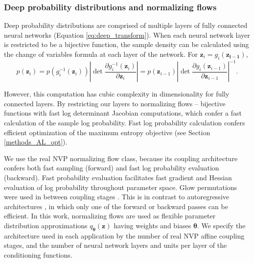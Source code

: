 \documentclass[11pt]{article}
\begin{document}
\subsubsection{Deep probability distributions and normalizing flows}\label{methods_NF}
Deep probability distributions are comprised of multiple layers of fully connected neural networks (Equation \ref{eq:deep_transform}).
When each neural network layer is restricted to be a bijective function, the sample density can be calculated using the change of variables formula at each layer of the network.  For $\mathbf{z}_i = g_i(\mathbf{z_{i-1}})$,
\begin{equation}
p(\mathbf{z}_i) = p(g_i^{-1}(\mathbf{z}_i)) \left| \det \frac{\partial g_i^{-1}(\mathbf{z}_i)}{\partial \mathbf{z}_i} \right| = p(\mathbf{z}_{i-1}) \left| \det \frac{\partial g_i(\mathbf{z}_{i-1})}{\partial \mathbf{z}_{i-1}} \right|^{-1}.
\end{equation}

However, this computation has cubic complexity in dimensionality for fully connected layers.  
By restricting our layers to normalizing flows \cite{rezende2015variational, papamakarios2019normalizing} -- bijective functions with fast log determinant Jacobian computations, which confer a fast calculation of the sample log probability.
Fast log probability calculation confers efficient optimization of the maximum entropy objective (see Section \ref{methods_AL_opt}).

We use the real NVP \cite{dinh2017density} normalizing flow class, because its coupling architecture confers both fast sampling (forward) and fast log probability evaluation (backward).
Fast probability evaluation  facilitates fast gradient and Hessian evaluation of log probability throughout parameter space.
Glow permutations were used in between coupling stages \cite{kingma2018glow}.
This is in contrast to autoregressive architectures \cite{papamakarios2017masked, kingma2016improved}, in which only one of the forward or backward passes can be efficient.
In this work, normalizing flows are used as flexible parameter distribution approximations $q_{\bm{\theta}}(\mathbf{z})$ having weights and biases $\bm{\theta}$. 
We specify the architecture used in each application by the number of real NVP affine coupling stages, and the number of neural network layers and units per layer of the conditioning functions.
\end{document}
